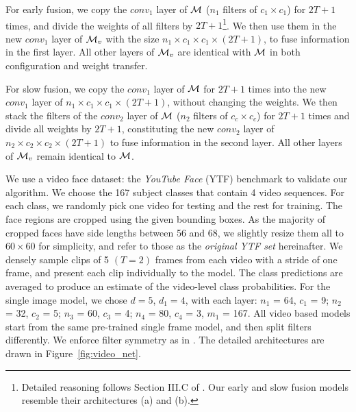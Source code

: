 \documentclass[10pt,twocolumn,twoside]{IEEEtran} %
\begin{document}
For early fusion, we copy the $conv_1$ layer of ${\mathcal{M}}$ ($n_1$ filters of $c_1 \times c_1$) for $2T + 1$ times, and divide the weights of all filters by $2T+1$\footnote{
Detailed reasoning follows Section III.C of \cite{kappeler2016video}. Our early and slow fusion models resemble their architectures (a) and (b). }. 
We then use them in the new $conv_1$ layer of ${\mathcal{M}}_v$ with the size $n_1 \times c_1 \times c_1 \times (2T+1)$, to fuse information in the first layer.
All other layers of ${\mathcal{M}}_v$ are identical with ${\mathcal{M}}$ in both configuration and weight transfer. 

For slow fusion, we copy the $conv_1$ layer of ${\mathcal{M}}$ for $2T + 1$ times into the new $conv_1$ layer of $n_1 \times c_1 \times c_1 \times (2T+1)$, without changing the weights. 
We then stack the filters of the $conv_2$ layer of ${\mathcal{M}}$  ($n_2$ filters of $c_c \times c_c$)  for $2T + 1$ times and divide all weights by $2T+1$, constituting the new $conv_2$ layer of $n_2 \times c_2 \times c_2 \times (2T+1)$ to fuse information in the second layer.
All other layers of ${\mathcal{M}}_v$ remain identical to ${\mathcal{M}}$.

We use a video face dataset: the \textit{YouTube Face} (YTF) benchmark \cite{wolf2011face} to validate our algorithm.
We choose the 167 subject classes that contain 4 video sequences.
For each class, we randomly pick one video for testing and the rest for training. The face regions are cropped using the given bounding boxes. As the majority of cropped faces have side lengths between 56 and 68, we slightly resize them all to $60 \times 60$ for simplicity, and refer to those as the \textit{original YTF set} hereinafter. We densely sample clips of 5 $(T = 2)$ frames  from each video with a stride of one frame, and present each clip individually to the model. The class predictions are averaged to produce an estimate of the video-level class probabilities. For the single image model,  we chose $d = 5$, $d_1 = 4$, with each layer: $n_1$ = 64, $c_1$ = 9; $n_2$ = 32, $c_2$ = 5; $n_3$ = 60, $c_3$ = 4; $n_4$ = 80, $c_4$ = 3, $m_1$ = 167. All video based models start from the same pre-trained single frame model, and then split filters differently. We enforce filter symmetry as in \cite{kappeler2016video}.  The detailed architectures are drawn in Figure~\ref{fig:video_net}.  
\end{document}
